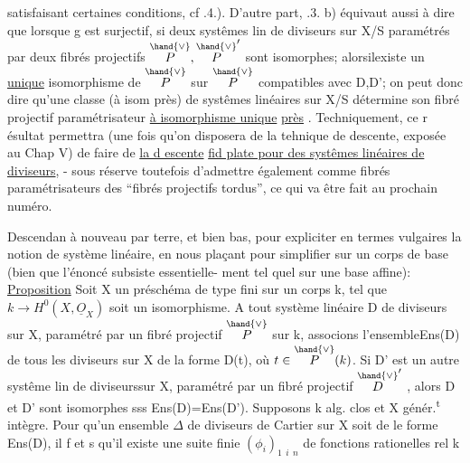 
satisfaisant certaines conditions, cf .4.). D'autre part, \hand{\S}.3. b)
équivaut  aussi à dire que lorsque g est surjectif, si deux systêmes lin de diviseurs
sur X/S  paramétrés par deux fibrés projectifs $\overset{\hand{\vee}}{P},\overset{\hand{\vee}}{P}'$ sont isomorphes;
alorsilexiste un \uline{unique} isomorphisme de $\overset{\hand{\vee}}{P}$ sur $\overset{\hand{\vee}}{P}$ compatibles avec D,D';
on peut donc dire qu'une classe (à isom près) de systêmes linéaires sur
X/S détermine son fibré projectif paramétrisateur \uline{à isomorphisme unique}
\uline{près} . Techniquement, ce r ésultat permettra (une fois qu'on disposera
de la tehnique de descente, exposée au Chap V) de faire de \uline{la d escente}
\uline{fid plate pour des systêmes linéaires de diviseurs}, - sous réserve
 toutefois d'admettre également comme fibrés paramétrisateurs des ``fibrés projectifs
tordus'', ce qui va être fait au prochain  numéro.

Descendan à nouveau par terre, et bien bas, pour expliciter en
termes vulgaires la notion de système linéaire, en nous plaçant pour
simplifier sur un corps de base (bien que l'énoncé subsiste essentielle-%
ment tel quel sur une base affine):
\uline{Proposition}  Soit X un préschéma   de type fini sur un corps k,
tel que $k\to H^0(X,\underline{O}_X)$ soit un isomorphisme. A tout système linéaire D de
diviseurs  sur X, paramétré par un fibré projectif $\overset{\hand{\vee}}{P}$ sur k, associons
l'ensemble\hand{(!)}Ens(D) de tous les diviseurs sur X de la forme D(t), où
$t\in\overset{\hand{\vee}}{P}(k)$.  Si  D' est un autre systême lin de diviseurssur X, paramétré par un
fibré projectif $\overset{\hand{\vee}}{D}'$ , alors D et D' sont isomorphes sss Ens(D)=Ens(D').
 Supposons k alg. clos et X génér.\textsuperscript{t} intègre.
\hand{(}Pour qu'un ensemble $\Delta$ de diviseurs de Cartier  sur X soit de
le forme Ens(D), il f et s qu'il existe 
 une suite finie $(\phi_i)_{1\ \ i\ \ n}$ de fonctions
rationelles rel k 


